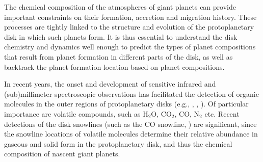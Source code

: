 \documentclass[apj]{emulateapj}
\newcommand{\emgr}[1]{\emph{ \color{gray} #1}}
\begin{document}

The chemical composition of the atmospheres of giant planets can provide important constraints on their formation, accretion and migration history. These processes are tightly linked to the structure and evolution of the protoplanetary disk in which such planets form. It is thus essential to understand the disk chemistry and dynamics well enough to predict the types of planet compositions that result from planet formation in different parts of the disk, as well as backtrack the planet formation location based on planet compositions. 





In recent years, the onset and development of sensitive infrared and (sub)millimeter spectroscopic observations has facilitated the detection of organic molecules in the outer regions of protoplanetary disks (e.g., \citealt{oberg10}, \citealt{oberg11c}, \citealt{oberg11b}). Of particular importance are volatile compounds, such as H$_2$O, CO$_2$, CO, N$_2$ etc. Recent detections of the disk snowlines (such as the CO snowline, \citealt{qi11}) are significant, since the snowline locations of volatile molecules determine their relative abundance in gaseous and solid form in the protoplanetary disk, and thus the chemical composition of nascent giant planets. %

\end{document}
